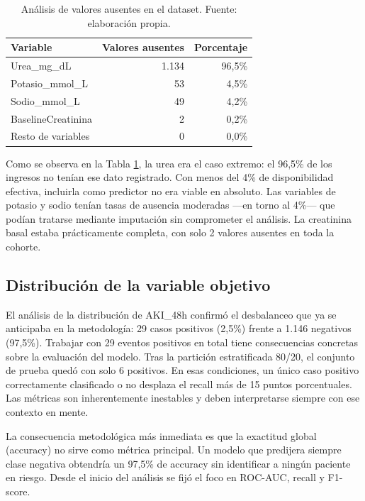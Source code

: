 \documentclass[12pt, a4paper, oneside]{report}
\begin{document}
\begin{table}[h]
\centering
\begin{tabular}{lrr}
\hline
\textbf{Variable} & \textbf{Valores ausentes} & \textbf{Porcentaje} \\
\hline
Urea\_mg\_dL & 1.134 & 96,5\% \\
Potasio\_mmol\_L & 53 & 4,5\% \\
Sodio\_mmol\_L & 49 & 4,2\% \\
BaselineCreatinina & 2 & 0,2\% \\
Resto de variables & 0 & 0,0\% \\
\hline
\end{tabular}
\caption{Análisis de valores ausentes en el dataset. Fuente: elaboración propia.}
\label{tab:missing}
\end{table}

Como se observa en la Tabla \ref{tab:missing}, la urea era el caso extremo: el 96,5\% de los ingresos no tenían ese dato registrado. Con menos del 4\% de disponibilidad efectiva, incluirla como predictor no era viable en absoluto. Las variables de potasio y sodio tenían tasas de ausencia moderadas —en torno al 4\%— que podían tratarse mediante imputación sin comprometer el análisis. La creatinina basal estaba prácticamente completa, con solo 2 valores ausentes en toda la cohorte.

\subsection{Distribución de la variable objetivo}

El análisis de la distribución de AKI\_48h confirmó el desbalanceo que ya se anticipaba en la metodología: 29 casos positivos (2,5\%) frente a 1.146 negativos (97,5\%). Trabajar con 29 eventos positivos en total tiene consecuencias concretas sobre la evaluación del modelo. Tras la partición estratificada 80/20, el conjunto de prueba quedó con solo 6 positivos. En esas condiciones, un único caso positivo correctamente clasificado o no desplaza el recall más de 15 puntos porcentuales. Las métricas son inherentemente inestables y deben interpretarse siempre con ese contexto en mente.

La consecuencia metodológica más inmediata es que la exactitud global (accuracy) no sirve como métrica principal. Un modelo que predijera siempre clase negativa obtendría un 97,5\% de accuracy sin identificar a ningún paciente en riesgo. Desde el inicio del análisis se fijó el foco en ROC-AUC, recall y F1-score.
\end{document}
